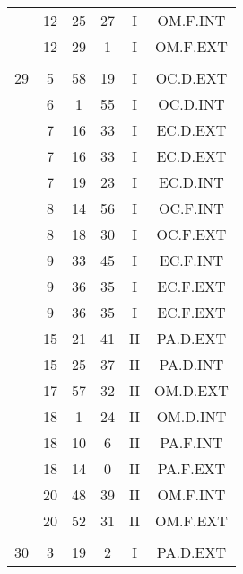 \documentclass[12pt, a4paper]{article}
\begin{document}
\begin{multicols}{3}
{\begin{tabular}{c c c c c c}
	 	 	 	 & 12 & 25 & 27 & I & OM.F.INT\\%
	 	 	 	 & 12 & 29 & 1 & I & OM.F.EXT\\%
	 	 	 	 & & & & & \\%
	 	 	 	29 & 5 & 58 & 19 & I & OC.D.EXT\\%
	 	 	 	 & 6 & 1 & 55 & I & OC.D.INT\\%
	 	 	 	 & 7 & 16 & 33 & I & EC.D.EXT\\%
	 	 	 	 & 7 & 16 & 33 & I & EC.D.EXT\\%
	 	 	 	 & 7 & 19 & 23 & I & EC.D.INT\\%
	 	 	 	 & 8 & 14 & 56 & I & OC.F.INT\\%
	 	 	 	 & 8 & 18 & 30 & I & OC.F.EXT\\%
	 	 	 	 & 9 & 33 & 45 & I & EC.F.INT\\%
	 	 	 	 & 9 & 36 & 35 & I & EC.F.EXT\\%
	 	 	 	 & 9 & 36 & 35 & I & EC.F.EXT\\%
	 	 	 	 & 15 & 21 & 41 & II & PA.D.EXT\\%
	 	 	 	 & 15 & 25 & 37 & II & PA.D.INT\\%
	 	 	 	 & 17 & 57 & 32 & II & OM.D.EXT\\%
	 	 	 	 & 18 & 1 & 24 & II & OM.D.INT\\%
	 	 	 	 & 18 & 10 & 6 & II & PA.F.INT\\%
	 	 	 	 & 18 & 14 & 0 & II & PA.F.EXT\\%
	 	 	 	 & 20 & 48 & 39 & II & OM.F.INT\\%
	 	 	 	 & 20 & 52 & 31 & II & OM.F.EXT\\%
	 	 	 	 & & & & & \\%
	 	 	 	30 & 3 & 19 & 2 & I & PA.D.EXT\\%

\end{tabular}}
\end{multicols}
\end{document}
